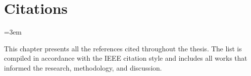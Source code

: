 \chapter{Citations}
\label{chap:citations}

\begingroup
{} %
\emergencystretch=3em %

This chapter presents all the references cited throughout the thesis. 
The list is compiled in accordance with the IEEE citation style and 
includes all works that informed the research, methodology, and discussion. 

\raggedright
\printbib

\endgroup

